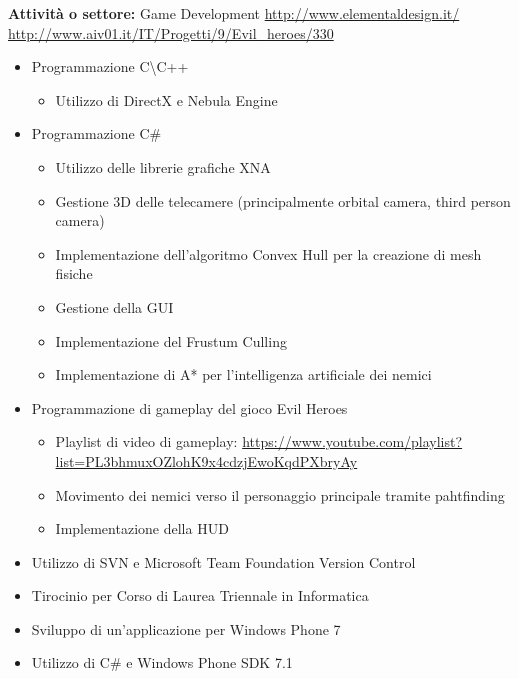 \documentclass[11pt,a4paper,sans]{moderncv} %
\begin{document}
{
	\textbf{Attivit\`{a} o settore:} Game Development
	\newline{}
	\url{http://www.elementaldesign.it/}
	\newline{}
	\url{http://www.aiv01.it/IT/Progetti/9/Evil_heroes/330} 
	\begin{itemize}
		\item Programmazione C\textbackslash C++
		\begin{itemize}
			\item Utilizzo di DirectX e Nebula Engine
		\end{itemize}
		\item Programmazione C\#
		\begin{itemize}
			\item Utilizzo delle librerie grafiche XNA
			\item Gestione 3D delle telecamere (principalmente orbital camera, third person camera)
			\item Implementazione dell'algoritmo Convex Hull per la creazione di mesh fisiche
			\item Gestione della GUI
			\item Implementazione del Frustum Culling
			\item Implementazione di A* per l'intelligenza artificiale dei nemici
		\end{itemize}
		\item Programmazione di gameplay del gioco Evil Heroes
		\begin{itemize}
			\item Playlist di video di gameplay:
			\newline{}
			\url{https://www.youtube.com/playlist?list=PL3bhmuxOZlohK9x4cdzjEwoKqdPXbryAy}
			\item Movimento dei nemici verso il personaggio principale tramite pahtfinding
			\item Implementazione della HUD
		\end{itemize}
		\item Utilizzo di SVN e Microsoft Team Foundation Version Control
	\end{itemize}
}

{
	\begin{itemize}
		\item Tirocinio per Corso di Laurea Triennale in Informatica
		\item Sviluppo di un'applicazione per Windows Phone 7
		\item Utilizzo di C\# e Windows Phone SDK 7.1
	\end{itemize}
}
\end{document}

